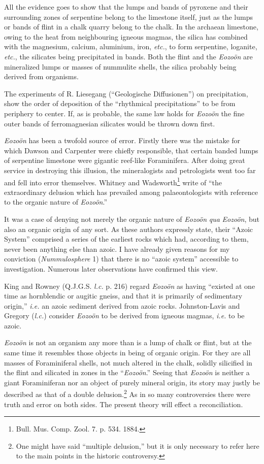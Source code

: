 \documentclass[a4paper, 12pt, oneside]{article}
\begin{document}
All the evidence goes to show that the lumps and bands of pyroxene and their surrounding zones of serpentine belong to the limestone itself, just as the lumps or bands of flint in a chalk quarry belong to the chalk. In the archaean limestone, owing to the heat from neighbouring igneous magmas, the silica has combined with the magnesium, calcium, aluminium, iron, \emph{etc.}, to form serpentine, loganite, \emph{etc.}, the silicates being precipitated in bands. Both the flint and the \emph{Eozoön} are mineralized lumps or masses of nummulite shells, the silica probably being derived from organisms.

The experiments of R. Liesegang (``Geologische Diffusionen'') on precipitation, show the order of deposition of the ``rhythmical precipitations'' to be from periphery to center. If, as is probable, the same law holds for \emph{Eozoön} the fine outer bands of ferromagnesian silicates would be thrown down first. 

\emph{Eozoön} has been a twofold source of error. Firstly there was the mistake for which Dawson and Carpenter were chiefly responsible, that certain banded lumps of serpentine limestone were gigantic reef-like Foraminifera. After doing great service in destroying this illusion, the mineralogists and petrologists went too far and fell into error themselves. Whitney and Wadsworth\footnote{Bull. Mus. Comp. Zool. 7. p. 534. 1884.} write of ``the extraordinary delusion which has prevailed among palaeontologists with reference to the organic nature of \emph{Eozoön}.''

It was a case of denying not merely the organic nature of \emph{Eozoön} \emph{qua} \emph{Eozoön}, but also an organic origin of any sort. As these authors expressly state, their ``Azoic System'' comprised a series of the earliest rocks which had, according to them, never been anything else than azoic. I have already given reasons for my conviction (\emph{Nummulosphere} 1) that there is no ``azoic system'' accessible to investigation. Numerous later observations have confirmed this view.

King and Rowney (Q.J.G.S. \emph{l.c.} p. 216) regard \emph{Eozoön} as having ``existed at one time as hornblendic or augitic gneiss, and that it is primarily of sedimentary origin,'' \emph{i.e.} an azoic sediment derived from azoic rocks. Johnston-Lavis and Gregory (\emph{l.c.}) consider \emph{Eozoön} to be derived from igneous magmas, \emph{i.e.} to be azoic.

\emph{Eozoön} is not an organism any more than is a lump of chalk or flint, but at the same time it resembles those objects in being of organic origin. For they are all masses of Foraminiferal shells, not much altered in the chalk, solidly silicified in the flint and silicated in zones in the ``\emph{Eozoön}.'' Seeing that \emph{Eozoön} is neither a giant Foraminiferan nor an object of purely mineral origin, its story may justly be described as that of a double delusion.\footnote{One might have said ``multiple delusion,'' but it is only necessary to refer here to the main points in the historic controversy.} As in so many controversies there were truth and error on both sides. The present theory will effect a reconciliation.
\end{document}
